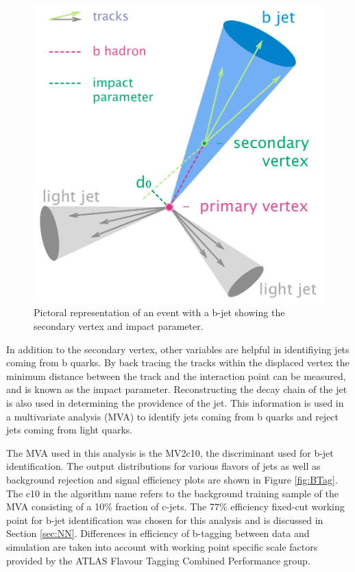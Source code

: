 \begin{figure}[h!]
	\centering
	\includegraphics[width=.5\columnwidth]{../ThesisImages/Simulation/B-tagging_diagram.png}
	\caption[Pictoral representation of an event with a b-jet showing the secondary vertex and impact parameter.]{Pictoral representation of an event with a b-jet showing the secondary vertex and impact parameter\cite{BTagImg}. 
	}
	\label{fig:BTagVars}
\end{figure}

In addition to the secondary vertex, other variables are helpful in identifiying jets coming from b quarks.  By back tracing the tracks within the displaced vertex the minimum distance between the track and the interaction point can be measured, and is known as the impact parameter.  Reconstructing the decay chain of the jet is also used in determining the providence of the jet.  This information is used in a multivariate analysis (MVA) to identify jets coming from b quarks and reject jets coming from light quarks.

The MVA used in this analysis is the MV2c10, the discriminant used for b-jet identification\cite{BJet1718}.  The output distributions for various flavors of jets as well as background rejection and signal efficiency plots are shown in Figure \ref{fig:BTag}.  The c10 in the algorithm name refers to the background training sample of the MVA consisting of a 10\% fraction of c-jets.  The 77\% efficiency fixed-cut working point for b-jet identification was chosen for this analysis and is discussed in Section \ref{sec:NN}.  Differences in efficiency of b-tagging between data and simulation are taken into account with working point specific scale factors provided by the ATLAS Flavour Tagging Combined Performance group.

